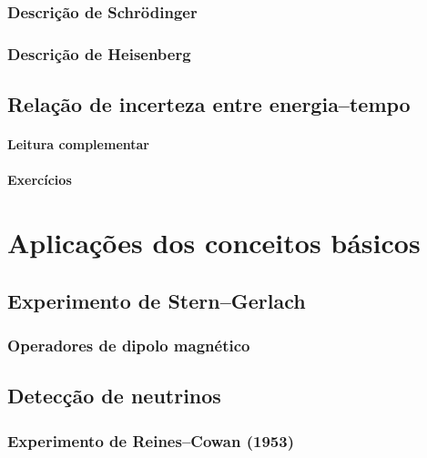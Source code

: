 \documentclass{header}
\begin{document}
            \subsection{Descrição de Schrödinger}

            \subsection{Descrição de Heisenberg}

        \section{Relação de incerteza entre energia--tempo}

        \subsubsection*{Leitura complementar}

        \subsubsection*{Exercícios}

    \chapter{\hspace{0.8cm}Aplicações dos conceitos básicos}

        \section{Experimento de Stern--Gerlach}
    
            \subsection{Operadores de dipolo magnético}
    
        \section{Detecção de neutrinos}
    
            \subsection{Experimento de Reines--Cowan (1953)}
    
\end{document}
